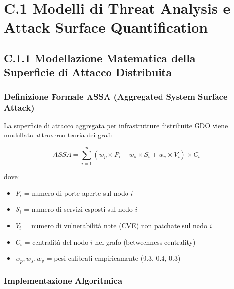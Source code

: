 \section{C.1 Modelli di Threat Analysis e Attack Surface Quantification}

\subsection{C.1.1 Modellazione Matematica della Superficie di Attacco Distribuita}

\subsubsection{Definizione Formale ASSA (Aggregated System Surface Attack)}

La superficie di attacco aggregata per infrastrutture distribuite GDO viene modellata attraverso teoria dei grafi:

\begin{equation}
ASSA = \sum_{i=1}^{n} (w_p \times P_i + w_s \times S_i + w_v \times V_i) \times C_i
\end{equation}

dove:
\begin{itemize}
    \item $P_i$ = numero di porte aperte sul nodo $i$
    \item $S_i$ = numero di servizi esposti sul nodo $i$
    \item $V_i$ = numero di vulnerabilità note (CVE) non patchate sul nodo $i$
    \item $C_i$ = centralità del nodo $i$ nel grafo (betweenness centrality)
    \item $w_p, w_s, w_v$ = pesi calibrati empiricamente (0.3, 0.4, 0.3)
\end{itemize}

\subsubsection{Implementazione Algoritmica}

